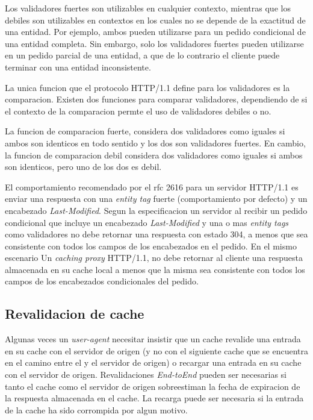 Los validadores fuertes son utilizables en cualquier contexto, mientras que los debiles son utilizables en contextos en los cuales no se depende de la exactitud de una entidad.
Por ejemplo, ambos pueden utilizarse para un pedido condicional de una entidad completa. Sin embargo, solo los validadores fuertes pueden utilizarse en un pedido parcial
de una entidad, a que de lo contrario el cliente puede terminar con una entidad inconsistente.

La unica funcion que el protocolo HTTP/1.1 define para los validadores es la comparacion. Existen dos funciones para comparar validadores, dependiendo de si el contexto
de la comparacion permte el uso de validadores debiles o no.

La funcion de comparacion fuerte, considera dos validadores como iguales si ambos son identicos en todo sentido y los dos son validadores fuertes. En cambio, la funcion de
comparacion debil considera dos validadores como iguales si ambos son identicos, pero uno de los dos es debil.

El comportamiento recomendado por el rfc 2616 \cite{rfc2616} para un servidor HTTP/1.1 es enviar una respuesta con una \emph{entity tag} fuerte (comportamiento por defecto)
y un encabezado \emph{Last-Modified}. Segun la especificacion un servidor al recibir un pedido condicional que incluye un encabezado \emph{Last-Modified} y una o mas
\emph{entity tags} como validadores no debe retornar una respuesta con estado 304, a menos que sea consistente con todos los campos de los encabezados en el pedido.
En el mismo escenario Un \emph{caching proxy} HTTP/1.1, no debe retornar al cliente una respuesta almacenada en su cache local a menos que la misma sea consistente con todos
los campos de los encabezados condicionales del pedido.

\subsection{Revalidacion de cache}
Algunas veces un \emph{user-agent} necesitar insistir que un cache revalide una entrada en su cache con el servidor de origen (y no con el siguiente cache que se encuentra
en el camino entre el y el servidor de origen) o recargar una entrada en su cache con el servidor de origen. Revalidaciones \emph{End-toEnd} pueden ser necesarias si tanto el
cache como el servidor de origen sobreestiman la fecha de expiracion de la respuesta almacenada en el cache. La recarga puede ser necesaria si la entrada de la cache ha sido
corrompida por algun motivo.


